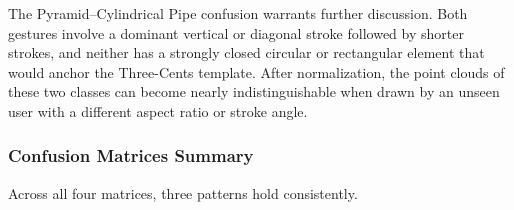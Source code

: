 \begin{table}[H]
\centering
\caption{Confusion matrix -- Domain~4, user-independent (95.1\%).}
\label{tab:cm_d4_indep}
\end{table}

The Pyramid--Cylindrical Pipe confusion warrants further discussion. Both gestures involve a dominant vertical or diagonal stroke followed by shorter strokes, and neither has a strongly closed circular or rectangular element that would anchor the Three-Cents template. After normalization, the point clouds of these two classes can become nearly indistinguishable when drawn by an unseen user with a different aspect ratio or stroke angle.

\subsubsection{Confusion Matrices Summary}

Across all four matrices, three patterns hold consistently.

